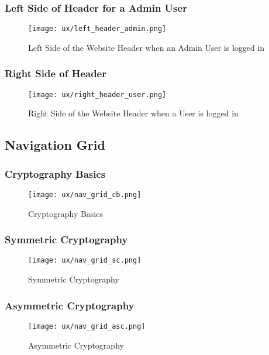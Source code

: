 \subsubsection{Left Side of Header for a Admin User}
\begin{figure}[H]
\begin{center}
\texttt{[image: ux/left\_header\_admin.png]}
\end{center} 
\caption{Left Side of the Website Header when an Admin User is logged in}
\label{ux_left_header_admin}
\end{figure}

\subsubsection{Right Side of Header}
\begin{figure}[H]
\begin{center}
\texttt{[image: ux/right\_header\_user.png]}
\end{center} 
\caption{Right Side of the Website Header when a User is logged in}
\label{ux_right_header_user}
\end{figure}


\subsection{Navigation Grid}

\subsubsection{Cryptography Basics}
\begin{figure}[H]
\begin{center}
\texttt{[image: ux/nav\_grid\_cb.png]}
\end{center} 
\caption{Cryptography Basics}
\label{ux_cb}
\end{figure}

\subsubsection{Symmetric Cryptography}
\begin{figure}[H]
\begin{center}
\texttt{[image: ux/nav\_grid\_sc.png]}
\end{center} 
\caption{Symmetric Cryptography}
\label{ux_sc}
\end{figure}

\subsubsection{Asymmetric Cryptography}
\begin{figure}[H]
\begin{center}
\texttt{[image: ux/nav\_grid\_asc.png]}
\end{center} 
\caption{Asymmetric Cryptography}
\label{ux_asc}
\end{figure}

